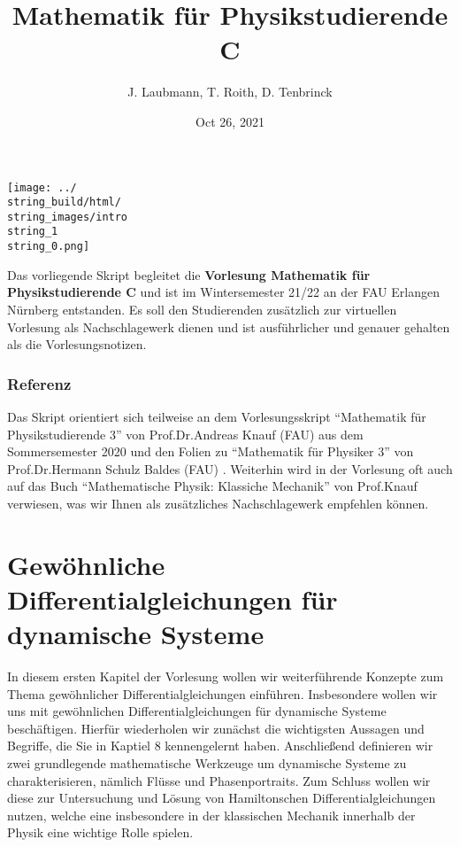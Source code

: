 \documentclass[letterpaper,10pt,english]{jupyterBook}
\title{Mathematik für Physikstudierende C}
\date{Oct 26, 2021}
\author{J.\@{} Laubmann, T.\@{} Roith, D.\@{} Tenbrinck}
\begin{document}
\label{\detokenize{intro::doc}}


\noindent\texttt{[image: ../\\string\_build/html/\\string\_images/intro\\string\_1\\string\_0.png]}

\par
Das vorliegende Skript begleitet die \textbf{Vorlesung Mathematik für Physikstudierende C} und ist im Wintersemester 21/22 an der FAU Erlangen Nürnberg entstanden. Es soll den Studierenden zusätzlich zur virtuellen Vorlesung als Nachschlagewerk dienen und ist ausführlicher und genauer gehalten als die Vorlesungsnotizen.

\subsection{Referenz}

\par
Das Skript orientiert sich teilweise an dem Vorlesungsskript “Mathematik für Physikstudierende 3” \cite{Kna20} von Prof.Dr.Andreas Knauf (FAU) aus dem Sommersemester 2020 und den Folien zu “Mathematik für Physiker 3” von Prof.Dr.Hermann Schulz Baldes (FAU) \cite{SB18}. Weiterhin wird in der Vorlesung oft auch auf das Buch “Mathematische Physik: Klassiche Mechanik” \cite{Kna17} von Prof.Knauf verwiesen, was wir Ihnen als zusätzliches Nachschlagewerk empfehlen können.


\chapter{Gewöhnliche Differentialgleichungen für dynamische Systeme}
\label{\detokenize{ode/ode:gewohnliche-differentialgleichungen-fur-dynamische-systeme}}\label{\detokenize{ode/ode::doc}}
\par
In diesem ersten Kapitel der Vorlesung wollen wir weiterführende Konzepte zum Thema gewöhnlicher Differentialgleichungen einführen.
Insbesondere wollen wir uns mit gewöhnlichen Differentialgleichungen für dynamische Systeme beschäftigen.
Hierfür wiederholen wir zunächst die wichtigsten Aussagen und Begriffe, die Sie in Kaptiel 8 \cite{Ten21} kennengelernt haben.
Anschließend definieren wir zwei grundlegende mathematische Werkzeuge um dynamische Systeme zu charakterisieren, nämlich Flüsse und Phasenportraits.
Zum Schluss wollen wir diese zur Untersuchung und Lösung von Hamiltonschen Differentialgleichungen nutzen, welche eine insbesondere in der klassischen Mechanik innerhalb der Physik eine wichtige Rolle spielen.
\end{document}
